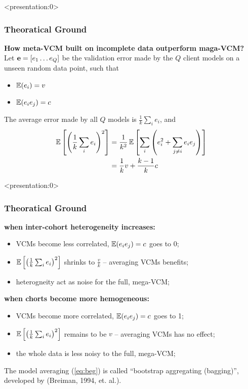 \documentclass{beamer}
\begin{document}
\begin{frame} <presentation:0> %
  \frametitle{Theoratical Ground} %
  \textbf{How meta-VCM built on incomplete data outperform maga-VCM?} \\
  Let $\mathbf{e}=[e_1 \dots e_Q]$ be the validation error made by the $Q$
  client models on a unseen random data point, such that
  \begin{itemize}
  \item $\operatorname{\mathbb{E}}(e_i) = v$
  \item $\operatorname{\mathbb{E}}(e_i e_j) = c$
  \end{itemize}
  The average error made by all $Q$ models is $\frac{1}{k}\sum_i e_i$,
  and
  \begin{align} \label{eq:beg}
    \operatorname{\mathbb{E}}\left[ \left(\frac{1}{k}\sum_i e_i\right)^2 \right]
    &= \frac{1}{k^2}\operatorname{\mathbb{E}}\left[\sum_i \left(e_i^2 + \sum_{j \ne i}e_ie_j \right)  \right] \\
    &= \frac{1}{k}v + \frac{k-1}{k}c
  \end{align}
\end{frame}
\begin{frame} <presentation:0>%
  \frametitle{Theoratical Ground}%
  \textbf{when inter-cohort heterogeneity increases:}
  \begin{itemize}
  \item VCMs become less correlated, $\operatorname{\mathbb{E}}(e_i e_j) = c$ goes to 0;
  \item $\operatorname{\mathbb{E}}\left[ \left(\frac{1}{k}\sum_i e_i\right)^2 \right]$ shrinks
    to $\frac{v}{k}$ -- averaging VCMs benefits;
  \item heterogneity act as noise for the full, mega-VCM;
  \end{itemize}
  \textbf{when chorts become more hemogeneous:}
  \begin{itemize}
  \item VCMs become more correlated, $\operatorname{\mathbb{E}}(e_i e_j) = c$ goes to 1;
  \item $\operatorname{\mathbb{E}}\left[ \left(\frac{1}{k}\sum_i e_i\right)^2 \right]$ remains
    to be $v$ -- averaging VCMs has no effect;
  \item the whole data is less noisy to the full, mega-VCM;
  \end{itemize}
  The model averaging (\ref{eq:beg}) is called ``bootstrap aggregating
  (bagging)'', developed by (Breiman, 1994, et. al.).
\end{frame}
\end{document}
